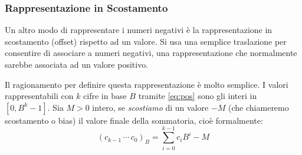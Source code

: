 \subsubsection{Rappresentazione in Scostamento}

Un altro modo di rappresentare i numeri negativi è la rappresentazione in scostamento (offset) rispetto ad un valore. Si usa una semplice traslazione
per consentire di associare a numeri negativi, una rappresentazione che normalmente sarebbe associata ad un valore positivo.

Il ragionamento per definire questa rappresentazione è molto semplice. I valori
rappresentabili con $k$ cifre in base $B$ tramite \eqref{eq:pos} sono gli interi in $[0,B^k-1]$. Sia $M > 0$ intero, se \emph{scostiamo} di un valore $-M$ (che chiameremo scostamento o bias) il valore finale della sommatoria, cioè formalmente:
\[ (c_{k-1}\,\cdots\,c_{0})_B = \sum_{i=0}^{k-1} c_iB^i - M \]

%
%

